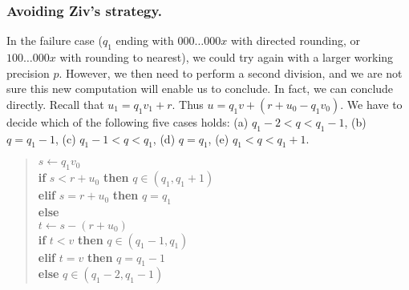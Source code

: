 \documentclass[12pt]{amsart}
\def\q{\hspace*{5mm}}
\begin{document}
\subsubsection{Avoiding Ziv's strategy.}
In the failure case ($q_1$ ending with $000\ldots 000x$ with directed rounding,
or $100 \ldots 000x$ with rounding to nearest),
we could try again with a larger working precision $p$.
However, we then need to perform a second
division, and we are not sure this new computation will enable us to conclude.
In fact, we can conclude directly. Recall that $u_1 = q_1 v_1 + r$.
Thus $u = q_1 v + (r + u_0 - q_1 v_0)$.
We have to decide which of the following five cases holds:
(a) $q_1 - 2 < q < q_1 - 1$, (b) $q = q_1-1$,
(c) $q_1-1 < q < q_1$, (d) $q=q_1$, (e) $q_1 < q < q_1+1$.
\begin{quote}
$s \leftarrow q_1 v_0$ \\
\textbf{if} $s < r + u_0$ \textbf{then} $q \in (q_1, q_1+1)$ \\
\textbf{elif} $s = r + u_0$ \textbf{then} $q = q_1$ \\
\textbf{else} \\ %
\q $t \leftarrow s - (r + u_0)$ \\ %
\q \textbf{if} $t < v$ \textbf{then} $q \in (q_1 - 1, q_1)$ \\
\textbf{elif} $t=v$ \textbf{then} $q = q_1-1$ \\
\textbf{else} $q \in (q_1 - 2, q_1-1)$
\end{quote}
\end{document}
